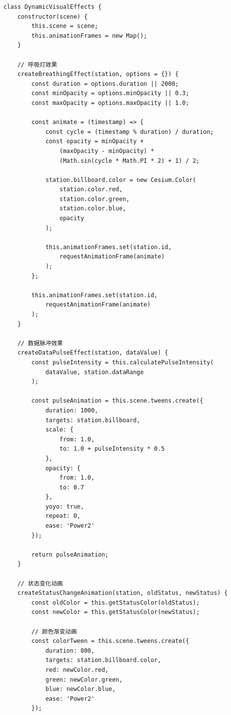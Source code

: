 \begin{lstlisting}
class DynamicVisualEffects {
    constructor(scene) {
        this.scene = scene;
        this.animationFrames = new Map();
    }
    
    // 呼吸灯效果
    createBreathingEffect(station, options = {}) {
        const duration = options.duration || 2000;
        const minOpacity = options.minOpacity || 0.3;
        const maxOpacity = options.maxOpacity || 1.0;
        
        const animate = (timestamp) => {
            const cycle = (timestamp % duration) / duration;
            const opacity = minOpacity + 
                (maxOpacity - minOpacity) * 
                (Math.sin(cycle * Math.PI * 2) + 1) / 2;
            
            station.billboard.color = new Cesium.Color(
                station.color.red,
                station.color.green,
                station.color.blue,
                opacity
            );
            
            this.animationFrames.set(station.id, 
                requestAnimationFrame(animate)
            );
        };
        
        this.animationFrames.set(station.id,
            requestAnimationFrame(animate)
        );
    }
    
    // 数据脉冲效果
    createDataPulseEffect(station, dataValue) {
        const pulseIntensity = this.calculatePulseIntensity(
            dataValue, station.dataRange
        );
        
        const pulseAnimation = this.scene.tweens.create({
            duration: 1000,
            targets: station.billboard,
            scale: {
                from: 1.0,
                to: 1.0 + pulseIntensity * 0.5
            },
            opacity: {
                from: 1.0,
                to: 0.7
            },
            yoyo: true,
            repeat: 0,
            ease: 'Power2'
        });
        
        return pulseAnimation;
    }
    
    // 状态变化动画
    createStatusChangeAnimation(station, oldStatus, newStatus) {
        const oldColor = this.getStatusColor(oldStatus);
        const newColor = this.getStatusColor(newStatus);
        
        // 颜色渐变动画
        const colorTween = this.scene.tweens.create({
            duration: 800,
            targets: station.billboard.color,
            red: newColor.red,
            green: newColor.green,
            blue: newColor.blue,
            ease: 'Power2'
        });
        

\end{lstlisting}
